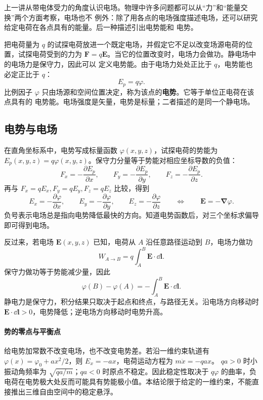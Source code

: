 上一讲从带电体受力的角度认识电场。物理中许多问题都可以从“力”和“能量交换”两个方面考察，电场也不
例外：除了用各点的电场强度描述电场，还可以研究给定电荷在各点具有的能量。后一种描述引出电势能和
电势。

把电荷量为 $q$ 的试探电荷放进一个既定电场，并假定它不足以改变场源电荷的位置，试探电荷受到的力为
$\boldsymbol F=q\boldsymbol E$。当它的位置改变时，电场力会做功。静电场中的电场力是保守力，因此可以
定义电势能。由于电场力处处正比于 $q$，电势能也必定正比于 $q$：
\begin{equation}
  \boxed{E_p=q\varphi}.
\end{equation}
比例因子 $\varphi$ 只由场源和空间位置决定，称为该点的\textbf{电势}。它等于单位正电荷在该点具有的
电势能。电场强度是矢量，电势是标量；二者描述的是同一个静电场。

\subsection*{电势与电场}

在直角坐标系中，电势写成标量函数 $\varphi(x,y,z)$，试探电荷的势能为
$E_p(x,y,z)=q\varphi(x,y,z)$。保守力分量等于势能对相应坐标导数的负值：
\[
  F_x=-\frac{\partial E_p}{\partial x},\qquad
  F_y=-\frac{\partial E_p}{\partial y},\qquad
  F_z=-\frac{\partial E_p}{\partial z}.
\]
再与 $F_x=qE_x,F_y=qE_y,F_z=qE_z$ 比较，得到
\begin{equation}
  \boxed{E_x=-\frac{\partial\varphi}{\partial x},\qquad
  E_y=-\frac{\partial\varphi}{\partial y},\qquad
  E_z=-\frac{\partial\varphi}{\partial z}}
  \qquad\Longleftrightarrow\qquad
  \boxed{\boldsymbol E=-\boldsymbol\nabla\varphi}.
\end{equation}
负号表示电场总是指向电势降低最快的方向。知道电势函数后，对三个坐标求偏导即可得到电场。

反过来，若电场 $\boldsymbol E(x,y,z)$ 已知，电荷从 $A$ 沿任意路径运动到 $B$，电场力做功
\[
  W_{A\to B}=q\int_A^B\boldsymbol E\cdot\dd\boldsymbol l.
\]
保守力做功等于势能减少量，因此
\begin{equation}
  \boxed{\varphi(B)-\varphi(A)
  =-\int_A^B\boldsymbol E\cdot\dd\boldsymbol l}.
\end{equation}
静电力是保守力，积分结果只取决于起点和终点，与路径无关。沿电场方向移动时
$\boldsymbol E\cdot\dd\boldsymbol l>0$，电势降低；逆电场方向移动时电势升高。


\paragraph{势的零点与平衡点}
给电势加常数不改变电场，也不改变电势差。若沿一维约束轨道有
$\varphi(x)=\varphi_0+ax^2/2$，则 $E_x=-ax$，电荷运动方程为 $m\ddot x=-qa x$。
$qa>0$ 时小振动角频率为 $\sqrt{qa/m}$；$qa<0$ 时原点不稳定。因此稳定性取决于 $q\varphi$ 的曲率，负电荷在电势极大处反而可能具有势能极小值。本结论限于给定的一维约束，不能直接推出三维自由空间中的稳定悬浮。

